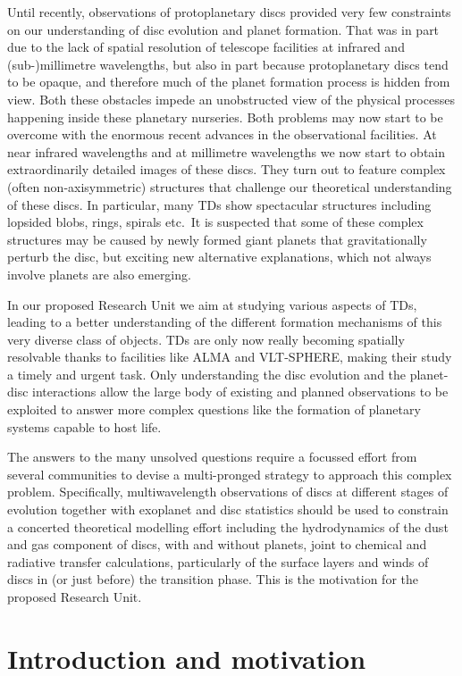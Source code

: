 \documentclass[10pt,fleqn,twoside]{article}
\begin{document}
Until recently, observations of protoplanetary discs provided very few
constraints on our understanding of disc evolution and planet formation. That was in part due
to the lack of spatial resolution of telescope facilities at infrared and
(sub-)millimetre wavelengths, but also in part because protoplanetary discs
tend to be opaque, and therefore much of the planet formation process is
hidden from view. Both these obstacles impede an unobstructed view of the
physical processes happening inside these planetary nurseries. Both problems may now start to
be overcome with the enormous recent advances in the observational
facilities. At near infrared wavelengths and at millimetre wavelengths we
now start to obtain extraordinarily detailed images of these discs. They
turn out to feature complex (often non-axisymmetric) structures that
challenge our theoretical understanding of these discs. In particular,
many TDs show spectacular structures including lopsided blobs, rings,
spirals etc.\ It is suspected 
that some of these complex structures may be caused by newly formed giant
planets that gravitationally perturb the disc, but exciting new
alternative explanations, which not always involve planets are also emerging. 

In our proposed Research Unit we aim at studying various aspects of
TDs, leading to a better understanding of the different formation
mechanisms of this very diverse class of objects. TDs are
only now really becoming spatially resolvable thanks
to facilities like ALMA and VLT-SPHERE, making their study a timely and
urgent task. Only understanding the disc evolution and the planet-disc
interactions allow the large body of existing and planned observations to be
exploited to answer more complex questions like the formation of planetary
systems capable to host life.

The answers to the many unsolved questions require a focussed effort from
several communities to devise a multi-pronged strategy to approach this
complex problem. Specifically, multiwavelength observations of discs at
different stages of evolution together with exoplanet and disc statistics
should be used to constrain a concerted theoretical modelling effort
including the hydrodynamics of the dust and gas component of discs, with and
without planets, joint to chemical and radiative transfer calculations,
particularly of the surface layers and winds of discs in (or just
before) the transition phase. This is the motivation for the proposed Research Unit.


\section{Introduction and motivation}
\end{document}
